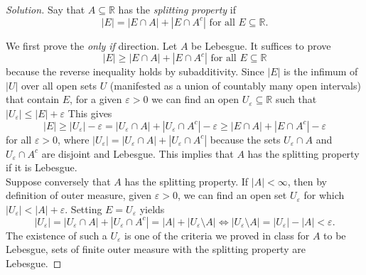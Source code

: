 \documentclass[10pt]{article}
\providecommand{\eps}{\varepsilon}
\providecommand{\RR}{\mathbb R}
\newenvironment{soln}{\begin{proof}[Solution]}{\end{proof}}
\providecommand{\abs}[1]{\left|#1\right|}
\begin{document}
\begin{soln}
    Say that $A\subseteq\RR$ has the \emph{splitting property} if
    \begin{equation*}
	\abs E = \abs{E\cap A} + \abs{E \cap A^c} \text{ for all }E\subseteq\RR.
    \end{equation*}

    We first prove the \emph{only if} direction.
    Let $A$ be Lebesgue. It suffices to prove
    \begin{equation*}
	\abs E \ge \abs{E\cap A} + \abs{E\cap A^c}\text{ for all }E\subseteq\RR
    \end{equation*}
    because the reverse inequality holds by subadditivity.
    Since $\abs E$ is the infimum of $\abs U$ over
    all open sets $U$ (manifested as a union of
    countably many open intervals) that contain $E$,
    for a given $\eps>0$ we can find an open $U_\eps\subseteq\RR$
    such that $\abs{U_\eps}\le \abs E + \eps$
    This gives
    \begin{equation*}
	\abs E \ge \abs{U_\eps} - \eps
	= \abs{U_\eps\cap A} + \abs{U_\eps\cap A^c} - \eps
	\ge \abs{E\cap A} + \abs{E\cap A^c} - \eps
    \end{equation*}
    for all $\eps>0$, where
    $\abs{U_\eps} = \abs{U_\eps\cap A} + \abs{U_\eps\cap A^c}$
    because the sets $U_\eps\cap A$ and $U_\eps\cap A^c$
    are disjoint and Lebesgue. This implies that
    $A$ has the splitting property if it is Lebesgue.
    \\

    Suppose conversely that $A$ has the splitting property.
    If $\abs A <\infty$, then by definition of outer measure,
    given $\eps > 0$, we can find an open set $U_\eps$ for which
    $\abs{U_\eps} < \abs A + \eps$. Setting $E = U_\eps$ yields
    \begin{equation*}
	\abs{U_\eps} = \abs{U_\eps\cap A} + \abs{U_\eps\cap A^c}
	= \abs A + \abs{U_\eps\setminus A}
	\iff \abs{U_\eps\setminus A} = \abs{U_\eps} - \abs A < \eps.
    \end{equation*}
    The existence of such a $U_\eps$ is one of the criteria we proved in class
    for $A$ to be Lebesgue, sets of finite outer measure
    with the splitting property are Lebesgue.


\end{soln}
\end{document}
